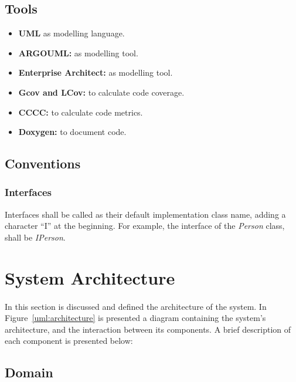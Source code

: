 \documentclass[a4paper,10pt]{article}
\begin{document}
\subsection{Tools}

\begin{itemize}

   \item \textbf{UML} as modelling language.

   \item \textbf{ARGOUML:} as modelling tool.
   
   \item \textbf{Enterprise Architect:} as modelling tool.

   \item \textbf{Gcov and LCov:} to calculate code coverage.
   
   \item \textbf{CCCC:} to calculate code metrics.

   \item \textbf{Doxygen:} to document code. 
   

\end{itemize}

\subsection{Conventions}
\subsubsection{Interfaces}
Interfaces shall be called as their default implementation class name, adding a character ``I'' at the beginning. For example, the interface of the \emph{Person} class, shall be \emph{IPerson}.

\section{System Architecture}
\label{architecture}

\paragraph{}
In this section is discussed and defined the architecture of the system. In Figure~\ref{uml:architecture} is presented a diagram containing the system's architecture, and the interaction between its components. A brief description of each component is presented below:

\subsection{Domain}
\end{document}
